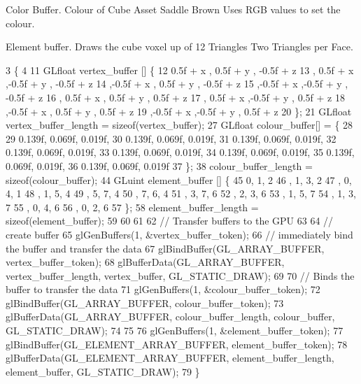 Color Buffer. Colour of Cube Asset Saddle Brown Uses R\+G\+B values to set the colour.

Element buffer. Draws the cube voxel up of 12 Triangles Two Triangles per Face.
\begin{DoxyCode}
3                                                      \{
4 
11   GLfloat vertex\_buffer [] \{
12       0.5f + x  , 0.5f + y  , -0.5f + z
13     , 0.5f + x  ,-0.5f + y  , -0.5f + z
14     ,-0.5f + x  , 0.5f + y  , -0.5f + z
15     ,-0.5f + x  ,-0.5f + y  , -0.5f + z
16     , 0.5f + x  , 0.5f + y  ,  0.5f + z 
17     , 0.5f + x  ,-0.5f + y  ,  0.5f + z
18     ,-0.5f + x  , 0.5f + y  ,  0.5f + z
19     ,-0.5f + x  ,-0.5f + y  ,  0.5f + z
20   \};
21   GLfloat vertex\_buffer\_length = \textcolor{keyword}{sizeof}(vertex\_buffer);
27   GLfloat colour\_buffer[] = \{
28 
29      0.139f, 0.069f, 0.019f,
30      0.139f, 0.069f, 0.019f,
31      0.139f, 0.069f, 0.019f,
32      0.139f, 0.069f, 0.019f,
33      0.139f, 0.069f, 0.019f,
34      0.139f, 0.069f, 0.019f,
35      0.139f, 0.069f, 0.019f,
36      0.139f, 0.069f, 0.019f
37   \};
38   colour\_buffer\_length = \textcolor{keyword}{sizeof}(colour\_buffer);
44   GLuint element\_buffer []  \{
45       0, 1, 2   
46     , 1, 3, 2
47     , 0, 4, 1   
48     , 1, 5, 4   
49     , 5, 7, 4   
50     , 7, 6, 4   
51     , 3, 7, 6   
52     , 2, 3, 6   
53     , 1, 5, 7   
54     , 1, 3, 7   
55     , 0, 4, 6   
56     , 0, 2, 6   
57   \};
58   element\_buffer\_length = \textcolor{keyword}{sizeof}(element\_buffer);
59 
60 
61 
62   \textcolor{comment}{// Transfer buffers to the GPU}
63 
64   \textcolor{comment}{// create buffer}
65   glGenBuffers(1, &vertex\_buffer\_token);
66   \textcolor{comment}{// immediately bind the buffer and transfer the data}
67   glBindBuffer(GL\_ARRAY\_BUFFER, vertex\_buffer\_token);
68   glBufferData(GL\_ARRAY\_BUFFER, vertex\_buffer\_length, vertex\_buffer, GL\_STATIC\_DRAW);
69   
70   \textcolor{comment}{// Binds the buffer to transfer the data}
71   glGenBuffers(1, &colour\_buffer\_token);
72   glBindBuffer(GL\_ARRAY\_BUFFER, colour\_buffer\_token);
73   glBufferData(GL\_ARRAY\_BUFFER, colour\_buffer\_length, colour\_buffer, GL\_STATIC\_DRAW);
74 
75 
76   glGenBuffers(1, &element\_buffer\_token);
77   glBindBuffer(GL\_ELEMENT\_ARRAY\_BUFFER, element\_buffer\_token);
78   glBufferData(GL\_ELEMENT\_ARRAY\_BUFFER, element\_buffer\_length, element\_buffer, GL\_STATIC\_DRAW);
79 \}
\end{DoxyCode}
\hypertarget{classCubeAsset_ab3ab9a5da82cbf8537a28652410093b1}{}
